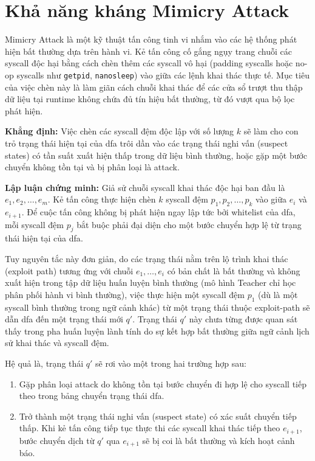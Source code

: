 \documentclass[../main.tex]{subfiles}
\begin{document}
\section{Khả năng kháng Mimicry Attack}
\label{sec:mimicry_attack}

Mimicry Attack \cite{wagner2002mimicry} là một kỹ thuật tấn công tinh vi nhắm vào các hệ thống
phát hiện bất thường dựa trên hành vi. Kẻ tấn công cố gắng ngụy trang
chuỗi các \gls{syscall} độc hại bằng cách chèn thêm các \gls{syscall} vô hại
(padding syscalls hoặc no-op syscalls như \texttt{getpid},
\texttt{nanosleep}) vào giữa các lệnh khai thác thực tế. Mục tiêu của
việc chèn này là làm giãn cách chuỗi khai thác để các cửa sổ trượt
thu thập dữ liệu tại runtime không chứa đủ tín hiệu bất thường, từ đó
vượt qua bộ lọc phát hiện.

\textbf{Khẳng định:} Việc chèn các \gls{syscall} đệm độc lập với số lượng
$k$ sẽ làm cho con trỏ trạng thái hiện tại của \gls{dfa} trôi dần vào các
trạng thái nghi vấn (suspect states) có tần suất xuất hiện thấp trong
dữ liệu bình thường, hoặc gặp một bước chuyển không tồn tại và bị
phân loại là attack.

\textbf{Lập luận chứng minh:} Giả sử chuỗi \gls{syscall} khai thác độc hại
ban đầu là $e_1, e_2, \dots, e_m$. Kẻ tấn công thực hiện chèn $k$
\gls{syscall} đệm $p_1, p_2, \dots, p_k$ vào giữa $e_i$ và $e_{i+1}$. Để
cuộc tấn công không bị phát hiện ngay lập tức bởi whitelist của \gls{dfa},
mỗi \gls{syscall} đệm $p_j$ bắt buộc phải đại diện cho một bước chuyển hợp
lệ từ trạng thái hiện tại của \gls{dfa}.

Tuy nguyên tắc này đơn giản, do các trạng thái nằm trên lộ trình khai
thác (exploit path) tương ứng với chuỗi $e_1, \dots, e_i$ có bản chất
là bất thường và không xuất hiện trong tập dữ liệu huấn luyện bình
thường (mô hình Teacher chỉ học phân phối hành vi bình thường), việc
thực hiện một \gls{syscall} đệm $p_1$ (dù là một \gls{syscall} bình thường trong
ngữ cảnh khác) từ một trạng thái thuộc exploit-path sẽ dẫn \gls{dfa} đến
một trạng thái mới $q'$. Trạng thái $q'$ này chưa từng được quan sát
thấy trong pha huấn luyện lành tính do sự kết hợp bất thường giữa ngữ
cảnh lịch sử khai thác và \gls{syscall} đệm.

Hệ quả là, trạng thái $q'$ sẽ rơi vào một trong hai trường hợp sau:
\begin{enumerate}
  \item Gặp phân loại attack do không tồn tại bước chuyển đi hợp lệ
    cho \gls{syscall} tiếp theo trong bảng chuyển trạng thái \gls{dfa}.
  \item Trở thành một trạng thái nghi vấn (suspect state) có xác suất
    chuyển tiếp thấp. Khi kẻ tấn công tiếp tục thực thi các \gls{syscall}
    khai thác tiếp theo $e_{i+1}$, bước chuyển dịch từ $q'$ qua
    $e_{i+1}$ sẽ bị coi là bất thường và kích hoạt cảnh báo.
\end{enumerate}
\end{document}
